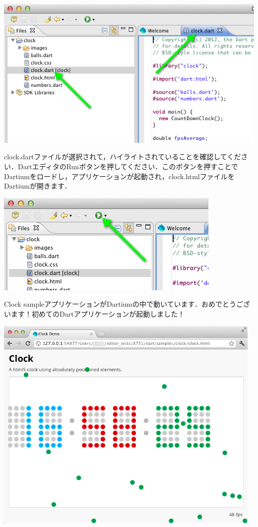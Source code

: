 \includegraphics{step1/clocksample3.png}

clock.dartファイルが選択されて，ハイライトされていることを確認してください．DartエディタのRunボタンを押してください．このボタンを押すことでDartiumをロードし，アプリケーションが起動され，clock.htmlファイルをDartiumが開きます．

\includegraphics{step1/clocksample4.png}

Clock sampleアプリケーションがDartiumの中で動いています．おめでとうございます！初めてのDartアプリケーションが起動しました！

\includegraphics[width=13cm]{step1/clocksample5.png}

